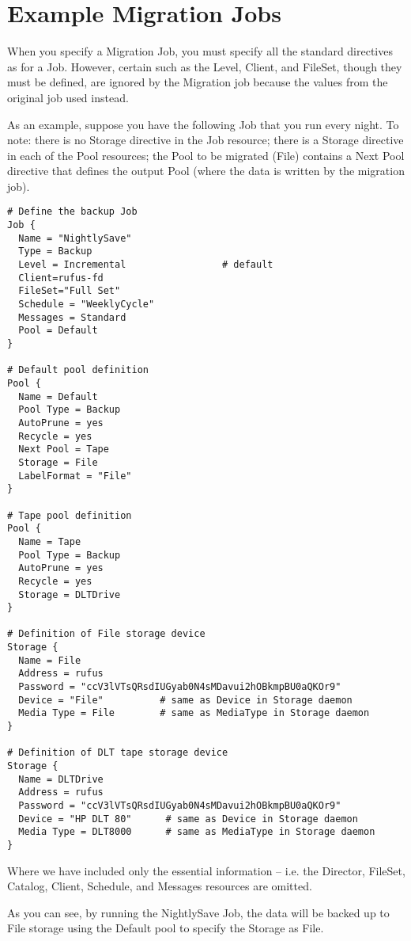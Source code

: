 \section{Example Migration Jobs}

When you specify a Migration Job, you must specify all the standard
directives as for a Job.  However, certain such as the Level, Client, and
FileSet, though they must be defined, are ignored by the Migration job
because the values from the original job used instead.

As an example, suppose you have the following Job that
you run every night. To note: there is no Storage directive in the
Job resource; there is a Storage directive in each of the Pool
resources; the Pool to be migrated (File) contains a Next Pool
directive that defines the output Pool (where the data is written
by the migration job).

\footnotesize
\begin{verbatim}
# Define the backup Job
Job {
  Name = "NightlySave"
  Type = Backup
  Level = Incremental                 # default
  Client=rufus-fd
  FileSet="Full Set"
  Schedule = "WeeklyCycle"
  Messages = Standard
  Pool = Default
}

# Default pool definition
Pool {
  Name = Default
  Pool Type = Backup
  AutoPrune = yes
  Recycle = yes
  Next Pool = Tape
  Storage = File
  LabelFormat = "File"
}

# Tape pool definition
Pool {
  Name = Tape
  Pool Type = Backup
  AutoPrune = yes
  Recycle = yes
  Storage = DLTDrive
}

# Definition of File storage device
Storage {
  Name = File
  Address = rufus
  Password = "ccV3lVTsQRsdIUGyab0N4sMDavui2hOBkmpBU0aQKOr9"
  Device = "File"          # same as Device in Storage daemon
  Media Type = File        # same as MediaType in Storage daemon
}

# Definition of DLT tape storage device
Storage {
  Name = DLTDrive
  Address = rufus
  Password = "ccV3lVTsQRsdIUGyab0N4sMDavui2hOBkmpBU0aQKOr9"
  Device = "HP DLT 80"      # same as Device in Storage daemon
  Media Type = DLT8000      # same as MediaType in Storage daemon
}

\end{verbatim}
\normalsize

Where we have included only the essential information -- i.e. the 
Director, FileSet, Catalog, Client, Schedule, and Messages resources are
omitted.

As you can see, by running the NightlySave Job, the data will be backed up
to File storage using the Default pool to specify the Storage as File.

